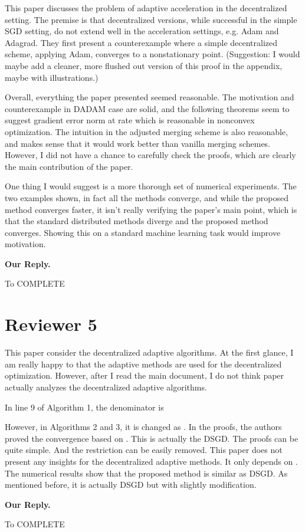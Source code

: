 \documentclass{article} %
\begin{document}
This paper discusses the problem of adaptive acceleration in the decentralized setting. The premise is that decentralized versions, while successful in the simple SGD setting, do not extend well in the acceleration settings, e.g. Adam and Adagrad. They first present a counterexample where a simple decentralized scheme, applying Adam, converges to a nonstationary point. (Suggestion: I would maybe add a cleaner, more flushed out version of this proof in the appendix, maybe with illustrations.)

Overall, everything the paper presented seemed reasonable. The motivation and counterexample in DADAM case are solid, and the following theorems seem to suggest gradient error norm  at rate  which is reasonable in nonconvex optimization. The intuition in the adjusted merging scheme is also reasonable, and makes sense that it would work better than vanilla merging schemes. However, I did not have a chance to carefully check the proofs, which are clearly the main contribution of the paper.

One thing I would suggest is a more thorough set of numerical experiments. The two examples shown, in fact all the methods converge, and while the proposed method converges faster, it isn't really verifying the paper's main point, which is that the standard distributed methods diverge and the proposed method converges. Showing this on a standard machine learning task would improve motivation.


\textbf{Our Reply.}

To COMPLETE



\section{Reviewer 5}
\vspace{-0.1in}

This paper consider the decentralized adaptive algorithms. At the first glance, I am really happy to that the adaptive methods are used for the decentralized optimization. However, after I read the main document, I do not think paper actually analyzes the decentralized adaptive algorithms.

In line 9 of Algorithm 1, the denominator is 

However, in Algorithms 2 and 3, it is changed as . In the proofs, the authors proved the convergence based on . This is actually the DSGD. The proofs can be quite simple. And the restriction  can be easily removed. This paper does not present any insights for the decentralized adaptive methods. It only depends on . The numerical results show that the proposed method is similar as DSGD. As mentioned before, it is actually DSGD but with slightly modification.


\textbf{Our Reply.}

To COMPLETE
\end{document}
